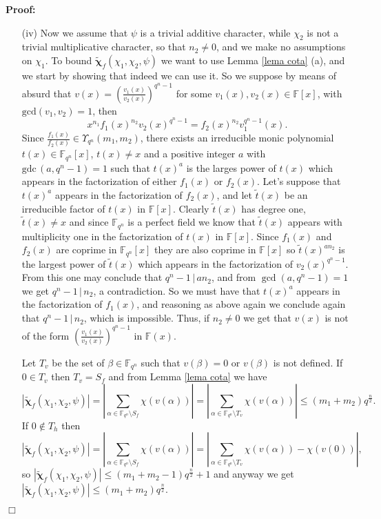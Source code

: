 \documentclass[12pt]{article}
\newenvironment{proof}{\noindent \textbf{Proof: }}{\hfill
$\Box$  \vspace{1ex}}
\newcommand{\F}{\mathbb{F}}
\def\bchi{\boldsymbol{\chi}}
\begin{document}
\begin{proof}
\begin{enumerate}
\item[(iv)] Now we assume that $\psi$ is a trivial additive character, while 
$\chi_2$ is not a trivial multiplicative character, so that $n_2 \neq 0$, and 
we make no assumptions 
on $\chi_1$.
To bound $\tilde{\bchi}_f(\chi_{1},\chi_{2},\psi) $
we want to use Lemma \ref{lema cota} (a), and we
start by showing that indeed we can use it. So we suppose by means of absurd
that $v(x) = \left( \frac{v_1(x)}{v_2(x)} \right)^{q^n-1}$
for some
$v_1(x),v_2(x)\in\mathbb{F}[x]$, with 
$\mbox{gcd}(v_1,v_2)=1$, then
\begin{equation*}
x^{n_1}f_1(x)^{n_2}v_2(x)^{q^n-1}=f_2(x)^{n_2}v_1^{q^n-1}(x).
\end{equation*}
Since $\frac{f_1(x)}{f_2(x)} \in \Upsilon_{q^n}
(m_1,m_2)$, there exists an
irreducible monic polynomial $t(x) \in \mathbb{F}_{q^n}[x]$, $t(x)\neq x$ and a
positive integer $a$
with $\mbox{gdc}\, (a,q^n-1)=1$ such that
$t(x)^a$ is the larges power of $t(x)$ which appears in the factorization of 
either $f_1(x)$ or $f_2(x)$. Let's
suppose that $t(x)^a$ appears in the factorization of $f_2(x)$, and let
$\tilde{t}(x)$ be an irreducible factor of $t(x)$ in $\mathbb{F}[x]$. Clearly
$\tilde{t}(x)$ has degree one, $\tilde{t}(x) \neq x$ and since $\mathbb{F}_{q^n}$
is a
perfect field we
know that $\tilde{t}(x)$ appears with multiplicity one in the factorization of
$t(x)$ in $\mathbb{F}[x]$.
Since $f_1(x)$ and $f_2(x)$ are coprime in $\mathbb{F}_{q^n}[x]$ they are also
coprime in  $\mathbb{F}[x]$ so
$\tilde{t}(x)^{a n_2}$ is the largest power of $\tilde{t}(x)$ which appears in 
the factorization of $v_2(x)^{q^n-1}$. From
this one may conclude that
$q^n-1 \, | \, a n_2$, and from $\gcd(a,q^n-1)=1$ we get $q^n-1 \, | \, n_2$, a
contradiction. So we must have that
$t(x)^a$ appears in the factorization of $f_1(x)$, and reasoning as above again
we
conclude again that $q^n-1\, | \, n_2$, which is impossible. Thus, if 
$n_2 \neq 0$ we get that $v(x)$ is not of the form $\left( 
\frac{v_1(x)}{v_2(x)} \right)^{q^n-1}$
in $\mathbb{F}(x)$.

Let $T_v$ be the set of $\beta \in \mathbb{F}_{q^n}$ such that $v(\beta) = 0$ or
$v(\beta)$ is not defined. If $0 \in T_v$ then $T_v = S_f$ and from Lemma
\ref{lema cota} we have
$$
\left| \tilde{\bchi}_f(\chi_{1},\chi_{2},\psi) \right|
=
\left| \sum_{\alpha\in\F_{q^n}\setminus S_f}\chi(v(\alpha))
\right| =
\left| \sum_{\alpha\in\F_{q^n}\setminus T_v}\chi(v(\alpha))
\right|
\leq (m_1 + m_2) q^{\frac{n}{2}}.
$$
If $0 \notin T_h$ then %
$$
\left| \tilde{\bchi}_f(\chi_{1},\chi_{2},\psi)\right|
=
\left| \sum_{\alpha\in\F_{q^n}\setminus S_f}\chi(v(\alpha))
\right| =
\left| \sum_{\alpha\in\F_{q^n}\setminus T_v}\chi(v(\alpha)) - \chi(v(0))
\right|,
$$
so
$\left| \tilde{\bchi}_f(\chi_{1},\chi_{2},\psi)\right|
\leq (m_1 + m_2 - 1) q^{\frac{n}{2}} + 1$ and
anyway we get $| \tilde{\bchi}_f(\chi_{1},\chi_{2},\psi) | \leq (m_1 + m_2)
q^{\frac{n}{2}}$.



\end{enumerate}
\end{proof}
\end{document}
